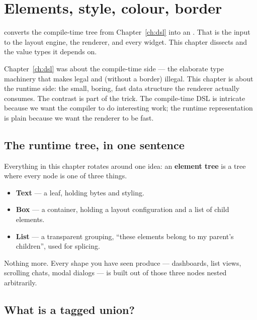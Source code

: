 \chapter{Elements, style, colour, border}
\label{ch:elements}

 converts the compile-time tree from
Chapter~\ref{ch:dsl} into an . That  is
the input to the layout engine, the renderer, and every widget. This
chapter dissects  and the value types it depends on.

\begin{aside}
Chapter~\ref{ch:dsl} was about the compile-time side --- the
elaborate type machinery that makes  legal and
 (without a border) illegal. This
chapter is about the runtime side: the small, boring, fast data
structure the renderer actually consumes. The contrast is part of
the trick. The compile-time DSL is intricate because we want the
compiler to do interesting work; the runtime representation is
plain because we want the renderer to be fast.
\end{aside}

\section{The runtime tree, in one sentence}
\label{sec:elem:sentence}

Everything in this chapter rotates around one idea: an
\textbf{element tree} is a tree where every node is one of three
things.

\begin{itemize}[leftmargin=*]
  \item \textbf{Text} --- a leaf, holding bytes and styling.
  \item \textbf{Box} --- a container, holding a layout configuration
    and a list of child elements.
  \item \textbf{List} --- a transparent grouping, ``these elements
    belong to my parent's children'', used for splicing.
\end{itemize}

Nothing more. Every shape you have seen \maya{} produce ---
dashboards, list views, scrolling chats, modal dialogs --- is built
out of those three nodes nested arbitrarily.

\section{What is a tagged union?}
\label{sec:elem:tagged-union}

